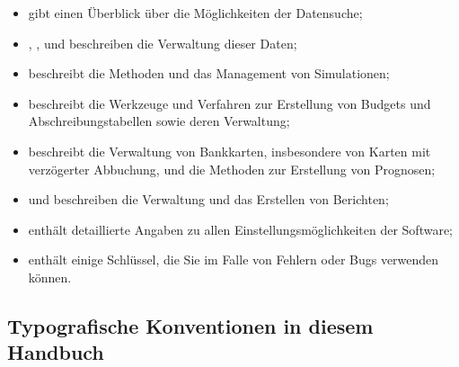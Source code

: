 \begin{itemize}
	\item {} gibt einen Überblick über die Möglichkeiten der Datensuche;%
	\item {}, ,  und  beschreiben die Verwaltung dieser Daten;%
	\item {} beschreibt die Methoden und das Management von Simulationen;%
	\item {} beschreibt die Werkzeuge und Verfahren zur Erstellung von Budgets und Abschreibungstabellen sowie deren Verwaltung;%
	\item {} beschreibt die Verwaltung von Bankkarten, insbesondere von Karten mit verzögerter Abbuchung, und die Methoden zur Erstellung von Prognosen;%
	\item {} und  beschreiben die Verwaltung und das Erstellen von Berichten;%
	\item {} enthält detaillierte Angaben zu allen Einstellungsmöglichkeiten der Software;%
	\item {} enthält einige Schlüssel, die Sie im Falle von Fehlern oder Bugs verwenden können.%
\end{itemize}


\subsection{Typografische Konventionen in diesem Handbuch\label{introduction-manual-conventions}}

